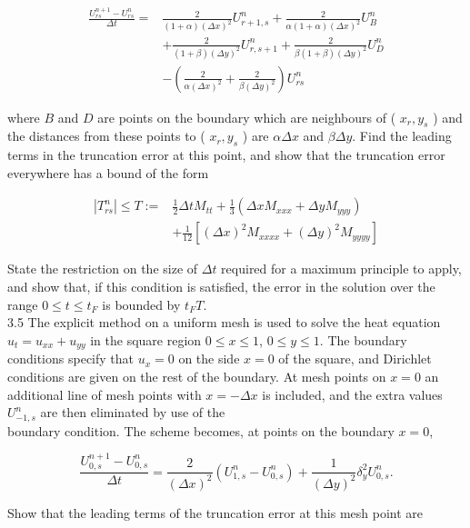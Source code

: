 \documentclass[10pt]{article}
\begin{document}
\[
\begin{aligned}
\frac{U_{r s}^{n+1}-U_{r s}^{n}}{\Delta t}= & \frac{2}{(1+\alpha)(\Delta x)^{2}} U_{r+1, s}^{n}+\frac{2}{\alpha(1+\alpha)(\Delta x)^{2}} U_{B}^{n} \\
& +\frac{2}{(1+\beta)(\Delta y)^{2}} U_{r, s+1}^{n}+\frac{2}{\beta(1+\beta)(\Delta y)^{2}} U_{D}^{n} \\
& -\left(\frac{2}{\alpha(\Delta x)^{2}}+\frac{2}{\beta(\Delta y)^{2}}\right) U_{r s}^{n}
\end{aligned}
\]

where \(B\) and \(D\) are points on the boundary which are neighbours of ( \(x_{r}, y_{s}\) ) and the distances from these points to ( \(x_{r}, y_{s}\) ) are \(\alpha \Delta x\) and \(\beta \Delta y\). Find the leading terms in the truncation error at this point, and show that the truncation error everywhere has a bound of the form

\[
\begin{aligned}
\left|T_{r s}^{n}\right| \leq T:= & \frac{1}{2} \Delta t M_{t t}+\frac{1}{3}\left(\Delta x M_{x x x}+\Delta y M_{y y y}\right) \\
& +\frac{1}{12}\left[(\Delta x)^{2} M_{x x x x}+(\Delta y)^{2} M_{y y y y}\right]
\end{aligned}
\]

State the restriction on the size of \(\Delta t\) required for a maximum principle to apply, and show that, if this condition is satisfied, the error in the solution over the range \(0 \leq t \leq t_{F}\) is bounded by \(t_{F} T\).\\
3.5 The explicit method on a uniform mesh is used to solve the heat equation \(u_{t}=u_{x x}+u_{y y}\) in the square region \(0 \leq x \leq 1\), \(0 \leq y \leq 1\). The boundary conditions specify that \(u_{x}=0\) on the side \(x=0\) of the square, and Dirichlet conditions are given on the rest of the boundary. At mesh points on \(x=0\) an additional line of mesh points with \(x=-\Delta x\) is included, and the extra values \(U_{-1, s}^{n}\) are then eliminated by use of the\\
boundary condition. The scheme becomes, at points on the boundary \(x=0\),

\[
\frac{U_{0, s}^{n+1}-U_{0, s}^{n}}{\Delta t}=\frac{2}{(\Delta x)^{2}}\left(U_{1, s}^{n}-U_{0, s}^{n}\right)+\frac{1}{(\Delta y)^{2}} \delta_{y}^{2} U_{0, s}^{n} .
\]

Show that the leading terms of the truncation error at this mesh point are
\end{document}
